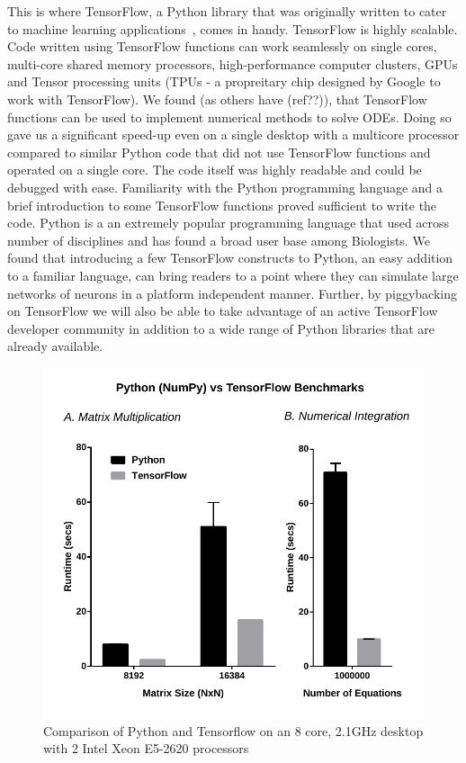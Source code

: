 \documentclass[10pt,letterpaper]{article}
\begin{document}
This is where TensorFlow, a Python library that was originally written to cater to machine learning applications~\cite{}, comes in handy. TensorFlow is highly scalable. Code written using TensorFlow functions can work seamlessly on single cores, multi-core shared memory processors, high-performance computer clusters, GPUs and Tensor processing units (TPUs - a propreitary chip designed by Google to work with TensorFlow). We found (as others have (ref??)), that TensorFlow functions can be used to implement numerical methods to solve ODEs. Doing so gave us a significant speed-up even on a single desktop with a multicore processor compared to similar Python code that did not use TensorFlow functions and operated on a single core. The code itself was highly readable and could be debugged with ease. Familiarity with the Python programming language and a brief introduction to some TensorFlow functions proved sufficient to write the code. Python is a an extremely popular programming language that used across number of disciplines and has found a broad user base among Biologists. We found that introducing a few TensorFlow constructs to Python, an easy addition to a familiar language, can bring readers to a point where they can simulate large networks of neurons in a platform independent manner. Further, by piggybacking on TensorFlow we will also be able to take advantage of an active TensorFlow developer community in addition to a wide range of Python libraries that are already available. 
\begin{figure}
\includegraphics[scale=0.7]{Figures/Bench.pdf} 
\caption{Comparison of Python and Tensorflow on an 8 core, 2.1GHz desktop with 2 Intel Xeon E5-2620 processors}
\label{fig:comparison}
\end{figure}
\end{document}
